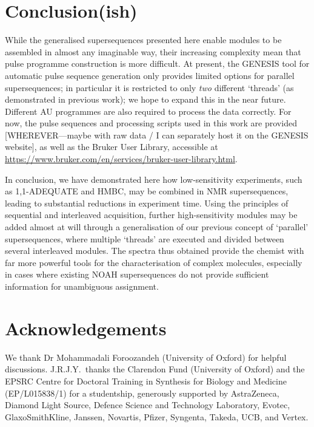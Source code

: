 \documentclass[a4paper,12pt]{article}
\newcommand{\nitrogen}{\ch{^{15}N}}
\newcommand{\todo}[1]{{\color{OrangeRed}#1}}
\begin{document}
\begin{refsection}
\section{Conclusion(ish)}

While the generalised supersequences presented here enable modules to be assembled in almost any imaginable way, their increasing complexity mean that pulse programme construction is more difficult.
At present, the GENESIS tool for automatic pulse sequence generation\autocite{Yong2022AC} only provides limited options for parallel supersequences; in particular it is restricted to only \textit{two} different `threads' (as demonstrated in previous work\autocite{Kupce2021JACSA}); we hope to expand this in the near future.
Different AU programmes are also required to process the data correctly.
For now, the pulse sequences and processing scripts used in this work are provided \todo{[WHEREVER---maybe with raw data / I can separately host it on the GENESIS website]}, as well as the Bruker User Library, accessible at \url{https://www.bruker.com/en/services/bruker-user-library.html}.

In conclusion, we have demonstrated here how low-sensitivity experiments, such as 1,1-ADEQUATE and \nitrogen{} HMBC, may be combined in NMR supersequences, leading to substantial reductions in experiment time.
Using the principles of sequential and interleaved acquisition, further high-sensitivity modules may be added almost at will through a generalisation of our previous concept of `parallel' supersequences, where multiple `threads' are executed and divided between several interleaved modules.
The spectra thus obtained provide the chemist with far more powerful tools for the characterisation of complex molecules, especially in cases where existing NOAH supersequences do not provide sufficient information for unambiguous assignment.

\section*{Acknowledgements}

We thank Dr Mohammadali Foroozandeh (University of Oxford) for helpful discussions.
J.R.J.Y.\ thanks the Clarendon Fund (University of Oxford) and the EPSRC Centre for Doctoral Training in Synthesis for Biology and Medicine (EP/L015838/1) for a studentship, generously supported by AstraZeneca, Diamond Light Source, Defence Science and Technology Laboratory, Evotec, GlaxoSmithKline, Janssen, Novartis, Pfizer, Syngenta, Takeda, UCB, and Vertex.

\AtNextBibliography{\small}
\printbibliography{}
\end{refsection}
\end{document}
